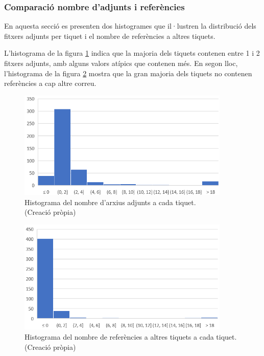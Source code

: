 \subsubsection{Comparació nombre d'adjunts i referències}
En aquesta secció es presenten dos histogrames que il·lustren la distribució dels fitxers adjunts per tiquet i el nombre de referències a altres tiquets.

L'histograma de la figura \ref{fig:histograma_num_adj} indica que la majoria dels tiquets contenen entre 1 i 2 fitxers adjunts, amb alguns valors atípics que contenen més. En segon lloc, l'histograma de la figura \ref{fig:histograma_num_refs} mostra que la gran majoria dels tiquets no contenen referències a cap altre correu. 

\begin{figure}[H]
    \centering
    \includegraphics[width=0.9\textwidth]{histograma_num_adj.png}
    \caption[Histograma del nombre d'adjunts a cada tiquet]{Histograma del nombre d'arxius adjunts a cada tiquet. \\ (Creació pròpia)}
    \label{fig:histograma_num_adj}
\end{figure}


\begin{figure}[H]
    \centering
    \includegraphics[width=0.9\textwidth]{histograma_num_refs.png}
    \caption[Histograma del nombre de referències a cada tiquet]{Histograma del nombre de referències a altres tiquets a cada tiquet. \\ (Creació pròpia)}
    \label{fig:histograma_num_refs}
\end{figure}

